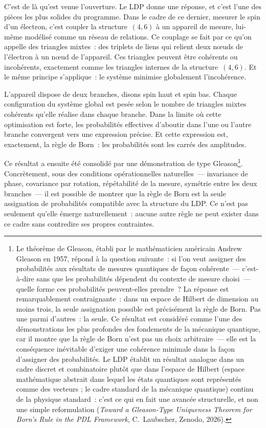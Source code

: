 \documentclass[12pt, a4paper, openright]{book}
\begin{document}
C'est de là qu'est venue l'ouverture. Le LDP donne une réponse, et c'est l'une des pièces les plus solides du programme. Dans le cadre de ce dernier, mesurer le spin d'un électron, c'est coupler la structure~$(4,6)$ à un appareil de mesure, lui-même modélisé comme un réseau de relations. Ce couplage se fait par ce qu'on appelle des triangles mixtes~: des triplets de liens qui relient deux nœuds de l'électron à un nœud de l'appareil. Ces triangles peuvent être cohérents ou incohérents, exactement comme les triangles internes de la structure~$(4,6)$. Et le même principe s'applique~: le système minimise globalement l'incohérence.

\medskip

L'appareil dispose de deux branches, disons \og spin haut\fg{} et \og spin bas\fg. Chaque configuration du système global est pesée selon le nombre de triangles mixtes cohérents qu'elle réalise dans chaque branche. Dans la limite où cette optimisation est forte, les probabilités effectives d'aboutir dans l'une ou l'autre branche convergent vers une expression précise. Et cette expression est, exactement, la règle de Born~: les probabilités sont les carrés des amplitudes.

\medskip

Ce résultat a ensuite été consolidé par une démonstration de type Gleason\footnote{Le théorème de Gleason, établi par le mathématicien américain Andrew Gleason en 1957, répond à la question suivante~: si l'on veut assigner des probabilités aux résultats de mesures quantiques de façon cohérente~--- c'est-à-dire sans que les probabilités dépendent du contexte de mesure choisi~--- quelle forme ces probabilités peuvent-elles prendre~? La réponse est remarquablement contraignante~: dans un espace de Hilbert de dimension au moins trois, la seule assignation possible est précisément la règle de Born. Pas une parmi d'autres~: la seule. Ce résultat est considéré comme l'une des démonstrations les plus profondes des fondements de la mécanique quantique, car il montre que la règle de Born n'est pas un choix arbitraire~--- elle est la conséquence inévitable d'exiger une cohérence minimale dans la façon d'assigner des probabilités. Le LDP établit un résultat analogue dans un cadre discret et combinatoire plutôt que dans l'espace de Hilbert (espace mathématique abstrait dans lequel les états quantiques sont représentés comme des vecteurs ; le cadre standard de la mécanique quantique) continu de la physique standard~: c'est ce qui en fait une avancée structurelle, et non une simple reformulation (\textit{Toward a Gleason-Type Uniqueness Theorem for Born's Rule in the PDL Framework}, C.~Laubscher, Zenodo, 2026).}. Concrètement, sous des conditions opérationnelles naturelles~--- invariance de phase, covariance par rotation, répétabilité de la mesure, symétrie entre les deux branches~--- il est possible de montrer que la règle de Born est la seule assignation de probabilités compatible avec la structure du LDP. Ce n'est pas seulement qu'elle émerge naturellement~: aucune autre règle ne peut exister dans ce cadre sans contredire ses propres contraintes.
\end{document}
